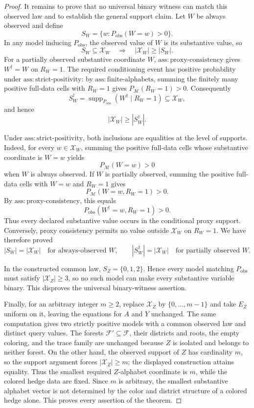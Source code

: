 \documentclass{article}
\begin{document}
\begin{proof}
It remains to prove that no universal binary witness can match this observed law and to establish the general support claim. Let \(W\) be always observed and define
\[
 S_W=\{w:P_{\mathrm{obs}}(W=w)>0\}.
\]
In any model inducing \(P_{\mathrm{obs}}\), the observed value of \(W\) is its substantive value, so
\[
 S_W\subseteq\mathcal X_W
 \quad\Longrightarrow\quad
 |\mathcal X_W|\geq |S_W|.
\]
For a partially observed substantive coordinate \(W\), \(\mathrm{ass{:}proxy\text{-}consistency}\) gives \(W^{\dagger}=W\) on \(R_W=1\). The required conditioning event has positive probability under \(\mathrm{ass{:}strict\text{-}positivity}\): by \(\mathrm{ass{:}finite\text{-}alphabets}\), summing the finitely many positive full-data cells with \(R_W=1\) gives \(P_{\mathcal M}(R_W=1)>0\). Consequently
\[
 S_W^{\dagger}
 =\operatorname{supp}_{P_{\mathrm{obs}}}(W^{\dagger}\mid R_W=1)
 \subseteq\mathcal X_W,
\]
and hence
\[
 |\mathcal X_W|\geq |S_W^{\dagger}|.
\]

Under \(\mathrm{ass{:}strict\text{-}positivity}\), both inclusions are equalities at the level of supports. Indeed, for every \(w\in\mathcal X_W\), summing the positive full-data cells whose substantive coordinate is \(W=w\) yields
\[
 P_{\mathcal M}(W=w)>0
\]
when \(W\) is always observed. If \(W\) is partially observed, summing the positive full-data cells with \(W=w\) and \(R_W=1\) gives
\[
 P_{\mathcal M}(W=w,R_W=1)>0.
\]
By \(\mathrm{ass{:}proxy\text{-}consistency}\), this equals
\[
 P_{\mathrm{obs}}(W^{\dagger}=w,R_W=1)>0.
\]
Thus every declared substantive value occurs in the conditional proxy support. Conversely, proxy consistency permits no value outside \(\mathcal X_W\) on \(R_W=1\). We have therefore proved
\[
 |S_W|=|\mathcal X_W|
 \quad\text{for always-observed }W,
 \qquad
 |S_W^{\dagger}|=|\mathcal X_W|
 \quad\text{for partially observed }W.
\]

In the constructed common law, \(S_Z=\{0,1,2\}\). Hence every model matching \(P_{\mathrm{obs}}\) must satisfy \(|\mathcal X_Z|\geq3\), so no such model can make every substantive variable binary. This disproves the universal binary-witness assertion.

Finally, for an arbitrary integer \(m\geq2\), replace \(\mathcal X_Z\) by \(\{0,\ldots,m-1\}\) and take \(E_Z\) uniform on it, leaving the equations for \(A\) and \(Y\) unchanged. The same computation gives two strictly positive models with a common observed law and distinct query values. The forests \(\mathcal F'\subseteq\mathcal F\), their districts and roots, the empty coloring, and the trace family are unchanged because \(Z\) is isolated and belongs to neither forest. On the other hand, the observed support of \(Z\) has cardinality \(m\), so the support argument forces \(|\mathcal X_Z|\geq m\); the displayed construction attains equality. Thus the smallest required \(Z\)-alphabet coordinate is \(m\), while the colored hedge data are fixed. Since \(m\) is arbitrary, the smallest substantive alphabet vector is not determined by the color and district structure of a colored hedge alone. This proves every assertion of the theorem.
\end{proof}
\end{document}
